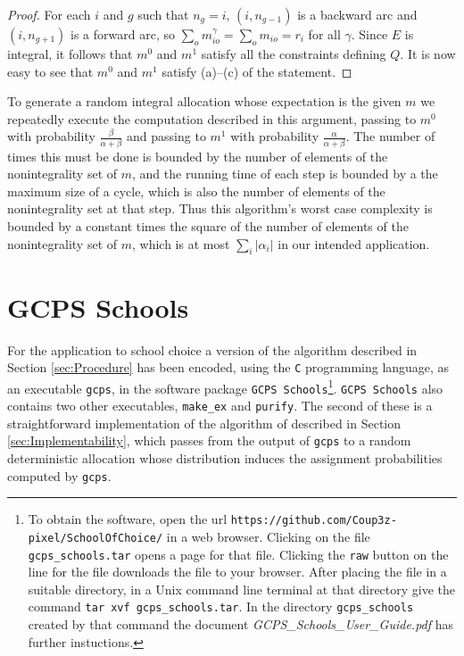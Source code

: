 \documentclass[12pt, A4paper]{article}
\theoremstyle{definition}
\begin{document}
\begin{appendix}
\begin{proof}
  For each $i$ and $g$ such that $n_g = i$, $(i,n_{g-1})$ is a backward arc and $(i,n_{g+1})$ is a forward arc, so $\sum_o m_{io}^\gamma = \sum_o m_{io} = r_i$ for all $\gamma$.  
  Since $E$ is integral, it follows that $m^0$ and $m^1$ satisfy all the constraints defining $Q$.  It is now easy to see that $m^0$ and $m^1$ satisfy (a)--(c) of the statement.
\end{proof}  

To generate a random integral allocation whose expectation is the given $m$ we repeatedly execute the computation described in this argument, passing to $m^0$ with probability $\tfrac{\beta}{\alpha + \beta}$ and  passing to $m^1$ with probability $\tfrac{\alpha}{\alpha + \beta}$.  The number of times this must be done is bounded by the number of elements of the nonintegrality set of $m$, and the running time of each step is bounded by a the maximum size of a cycle, which is also  the number of elements of the nonintegrality set at that step.  Thus this algorithm's worst case complexity is bounded by a constant times the square of the number of elements of the nonintegrality set of $m$, which is at most $\sum_i |\alpha_i|$ in our intended application.

\section{GCPS Schools} \label{sec:GCPSSchools}

For the application to school choice a version of the algorithm described in Section \ref{sec:Procedure} has been encoded, using the \texttt{C} programming language, as an executable \texttt{gcps}, in the software package \texttt{GCPS Schools}\footnote{To obtain the software, open the url \texttt{https://github.com/Coup3z-pixel/SchoolOfChoice/} in a web browser.  Clicking on the file \texttt{gcps\_schools.tar} opens a page for that file.  Clicking the \texttt{raw} button on the line for the file downloads the file to your browser.  After placing the file in a suitable directory, in a Unix command line terminal at that directory give the command \texttt{tar xvf gcps\_schools.tar}.  In the directory \texttt{gcps\_schools} created by that command the document \emph{GCPS\_Schools\_User\_Guide.pdf} has further instuctions.}.  \texttt{GCPS Schools} also contains two other executables, \texttt{make\_ex} and \texttt{purify}.  The second of these is a straightforward implementation of the algorithm of \cite{bckm13aer} described in Section \ref{sec:Implementability}, which passes from the output of \texttt{gcps} to a random deterministic allocation whose distribution induces the assignment probabilities computed by \texttt{gcps}.  


\end{appendix}
\end{document}
